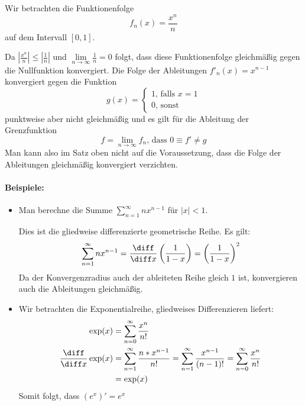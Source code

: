 Wir betrachten die Funktionenfolge
\begin{equation*}
	f_n(x)=\frac{x^n}n
\end{equation*}
auf dem Intervall $[0,1]$.

Da $|\frac{x^n}{n}|\leq|\frac1n|$ und $\lim\limits_{n\to\infty}\frac1n=0$ folgt, dass diese Funktionenfolge gleichmäßig gegen die Nullfunktion konvergiert. Die Folge der Ableitungen $f'_n(x)=x^{n-1}$ konvergiert gegen die Funktion
	\begin{equation*}
		g(x)=\begin{cases}
		1 \text{, falls } x=1\\
		0 \text{, sonst}
	\end{cases}
	\end{equation*}
	punktweise aber nicht gleichmäßig und es gilt für die Ableitung der Grenzfunktion
	\begin{equation*}
		f=\lim\limits_{n\to\infty} f_n \text{, dass } 0\equiv f'\neq g
	\end{equation*}
		Man kann also im Satz oben nicht auf die Voraussetzung, dass die Folge der Ableitungen gleichmäßig konvergiert verzichten.

\clearpage
\paragraph{Beispiele:}
\begin{itemize}
	\item Man berechne die Summe $\sum_{n=1}^\infty nx^{n-1}$ für $|x|<1$.

	Dies ist die gliedweise differenzierte geometrische Reihe. Es gilt:
	\begin{equation*}
		\sum\limits_{n=1}^\infty nx^{n-1}=\frac{\diff}{\diff x}\left(\frac{1}{1-x}\right)=\left(\frac{1}{1-x}\right)^2
	\end{equation*}
	Da der Konvergenzradius auch der ableiteten Reihe gleich $1$ ist, konvergieren auch die Ableitungen gleichmäßig.

	\item Wir betrachten die Exponentialreihe, gliedweises Differenzieren liefert:
	\begin{align*}
		\exp(x)&=\sum\limits_{n=0}^\infty \frac{x^n}{n!}\\
		\frac{\diff}{\diff x}\exp(x)&=\sum\limits_{n=1}^\infty \frac{n*x^{n-1}}{n!}=\sum\limits_{n=1}^\infty \frac{x^{n-1}}{(n-1)!}=\sum\limits_{n=0}^\infty \frac{x^{n}}{n!}\\
		&=\exp(x)
	\end{align*}
	Somit folgt, dass $(e^x)'=e^x$
\end{itemize}
